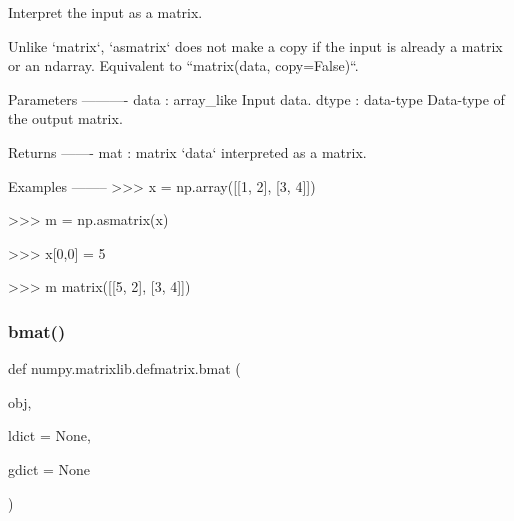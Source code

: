 \begin{DoxyVerb}Interpret the input as a matrix.

Unlike `matrix`, `asmatrix` does not make a copy if the input is already
a matrix or an ndarray.  Equivalent to ``matrix(data, copy=False)``.

Parameters
----------
data : array_like
    Input data.
dtype : data-type
   Data-type of the output matrix.

Returns
-------
mat : matrix
    `data` interpreted as a matrix.

Examples
--------
>>> x = np.array([[1, 2], [3, 4]])

>>> m = np.asmatrix(x)

>>> x[0,0] = 5

>>> m
matrix([[5, 2],
        [3, 4]])\end{DoxyVerb}
 \mbox{\label{namespacenumpy_1_1matrixlib_1_1defmatrix_a104688195ee702143122d056de815da2}} 
\subsubsection{\texorpdfstring{bmat()}{bmat()}}
{\footnotesize\ttfamily def numpy.\+matrixlib.\+defmatrix.\+bmat (\begin{DoxyParamCaption}\item[{}]{obj,  }\item[{}]{ldict = {\ttfamily None},  }\item[{}]{gdict = {\ttfamily None} }\end{DoxyParamCaption})}

